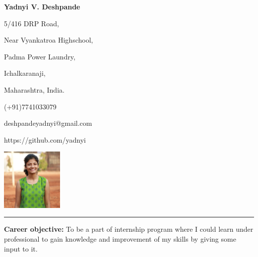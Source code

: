 \documentclass[a4paper,11pt]{article}
\begin{document}
	\begin{flushleft}
	 	\begin{Huge}
			\textbf{Yadnyi V. Deshpande}
		\end{Huge}
	\end{flushleft}

		\begin{minipage}[b]{0.33333\textwidth}
			\raggedright
			5/416 DRP Road,\par
			Near Vyankatroa Highschool,\par
			Padma Power Laundry, \par
			Ichalkaranaji,\par
			Maharashtra, India.
		\end{minipage}%
		\begin{minipage}[b]{0.33333\textwidth}
			\centering
			\begin{large}
				\raggedright
				(+91)7741033079\par
				deshpandeyadnyi@gmail.com\par
				https://github.com/yadnyi\par
			\end{large}
		\end{minipage}%
		\begin{minipage}[b]{0.33333\textwidth}
			\raggedleft
			\includegraphics[width = 30mm, height = 30mm]{yadnyi.JPG}
		\end{minipage}%
		
\noindent\rule{15cm}{0.4pt}	

\begin{minipage}[t]{1\textwidth}
			\raggedright\smallskip
			\begin{Large}
				\textbf{Career objective:}\medskip\linebreak%
				{\small To be a part of internship program where I could learn under professional to gain knowledge and improvement of my skills by giving some input to it.}\linebreak%
			\end{Large}
		\end{minipage}%
		\vspace{0.35cm}
\end{document}
